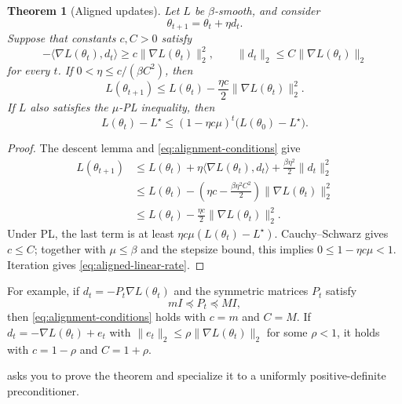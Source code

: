 \documentclass[11pt,twoside]{article}
\newtheorem{theorem}{Theorem}[section]
\theoremstyle{definition}
\theoremstyle{remark}
\begin{document}
\begin{theorem}[Aligned updates]
\label{thm:aligned-update}
Let $L$ be $\beta$-smooth, and consider
\begin{equation}
 \theta_{t+1}=\theta_t+\eta d_t.
 \label{eq:aligned-update}
\end{equation}
Suppose that constants $c,C>0$ satisfy
\begin{equation}
 -\langle\nabla L(\theta_t),d_t\rangle
 \ge c\|\nabla L(\theta_t)\|_2^2,
 \qquad
 \|d_t\|_2\le C\|\nabla L(\theta_t)\|_2
 \label{eq:alignment-conditions}
\end{equation}
for every $t$. If $0<\eta\le c/(\beta C^2)$, then
\begin{equation}
 L(\theta_{t+1})
 \le L(\theta_t)-\frac{\eta c}{2}
                  \|\nabla L(\theta_t)\|_2^2.
 \label{eq:aligned-descent}
\end{equation}
If $L$ also satisfies the $\mu$-PL inequality, then
\begin{equation}
 L(\theta_t)-L^\star
 \le(1-\eta c\mu)^t
       \bigl(L(\theta_0)-L^\star\bigr).
 \label{eq:aligned-linear-rate}
\end{equation}
\end{theorem}

\begin{proof}
The descent lemma and \cref{eq:alignment-conditions} give
\begin{align*}
 L(\theta_{t+1})
 &\le L(\theta_t)+\eta\langle\nabla L(\theta_t),d_t\rangle
                   +\frac{\beta\eta^2}{2}\|d_t\|_2^2\\
 &\le L(\theta_t)
 -\left(\eta c-\frac{\beta\eta^2C^2}{2}\right)
    \|\nabla L(\theta_t)\|_2^2\\
 &\le L(\theta_t)-\frac{\eta c}{2}
    \|\nabla L(\theta_t)\|_2^2.
\end{align*}
Under PL, the last term is at least
$\eta c\mu(L(\theta_t)-L^\star)$. Cauchy--Schwarz gives $c\le C$; together
with $\mu\le\beta$ and the stepsize bound, this implies
$0\le1-\eta c\mu<1$. Iteration gives
\cref{eq:aligned-linear-rate}.
\end{proof}

For example, if $d_t=-P_t\nabla L(\theta_t)$ and the symmetric matrices
$P_t$ satisfy
\[
 mI\preceq P_t\preceq MI,
\]
then \cref{eq:alignment-conditions} holds with $c=m$ and $C=M$. If
$d_t=-\nabla L(\theta_t)+e_t$ with
$\|e_t\|_2\le\rho\|\nabla L(\theta_t)\|_2$ for some $\rho<1$, it holds with
$c=1-\rho$ and $C=1+\rho$.

 asks you to prove the theorem and specialize it
to a uniformly positive-definite preconditioner.
\end{document}
